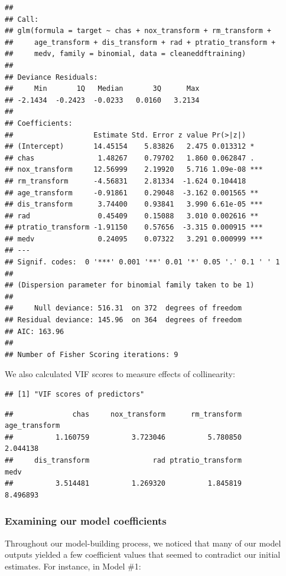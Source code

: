 \documentclass[
]{article}
\begin{document}
\begin{verbatim}
## 
## Call:
## glm(formula = target ~ chas + nox_transform + rm_transform + 
##     age_transform + dis_transform + rad + ptratio_transform + 
##     medv, family = binomial, data = cleaneddftraining)
## 
## Deviance Residuals: 
##     Min       1Q   Median       3Q      Max  
## -2.1434  -0.2423  -0.0233   0.0160   3.2134  
## 
## Coefficients:
##                   Estimate Std. Error z value Pr(>|z|)    
## (Intercept)       14.45154    5.83826   2.475 0.013312 *  
## chas               1.48267    0.79702   1.860 0.062847 .  
## nox_transform     12.56999    2.19920   5.716 1.09e-08 ***
## rm_transform      -4.56831    2.81334  -1.624 0.104418    
## age_transform     -0.91861    0.29048  -3.162 0.001565 ** 
## dis_transform      3.74400    0.93841   3.990 6.61e-05 ***
## rad                0.45409    0.15088   3.010 0.002616 ** 
## ptratio_transform -1.91150    0.57656  -3.315 0.000915 ***
## medv               0.24095    0.07322   3.291 0.000999 ***
## ---
## Signif. codes:  0 '***' 0.001 '**' 0.01 '*' 0.05 '.' 0.1 ' ' 1
## 
## (Dispersion parameter for binomial family taken to be 1)
## 
##     Null deviance: 516.31  on 372  degrees of freedom
## Residual deviance: 145.96  on 364  degrees of freedom
## AIC: 163.96
## 
## Number of Fisher Scoring iterations: 9
\end{verbatim}

We also calculated VIF scores to measure effects of collinearity:

\begin{verbatim}
## [1] "VIF scores of predictors"
\end{verbatim}

\begin{verbatim}
##              chas     nox_transform      rm_transform     age_transform 
##          1.160759          3.723046          5.780850          2.044138 
##     dis_transform               rad ptratio_transform              medv 
##          3.514481          1.269320          1.845819          8.496893
\end{verbatim}

\hypertarget{examining-our-model-coefficients}{%
\subsubsection{Examining our model
coefficients}\label{examining-our-model-coefficients}}

Throughout our model-building process, we noticed that many of our model
outputs yielded a few coefficient values that seemed to contradict our
initial estimates. For instance, in Model \#1:
\end{document}
